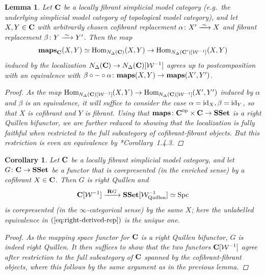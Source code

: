 \documentclass[reqno]{memo-l}
\theoremstyle{mythm}
\newtheorem{lemma}[thm]{Lemma}
\newtheorem{cor}[thm]{Corollary}
\theoremstyle{definition}
\numberwithin{equation}{section}
\newcommand{\Ww}{{\mathcal{W}}}
\DeclareMathOperator{\Spc}{Spc}
\renewcommand{\hom}{\textup{hom}}
\newcommand{\cat}[1]{\textbf{\textup{#1}}}
\newcommand{\maps}{\cat{maps}}
\newcommand{\op}{{\textup{op}}}
\renewcommand{\hom}{{\textup{Hom}}}
\newcommand{\id}{\textup{id}}
\newcommand{\iso}{\xrightarrow{\;\smash{\raisebox{-0.25ex}{\ensuremath{\scriptstyle\sim}}}\;}}
\begin{document}
\begin{lemma}\label{lemma:localization-on-homs}
    Let $\cat{C}$ be a locally fibrant simplicial model category (e.g.\ the underlying simplicial model category of topological model category), and let $X,Y\in\cat{C}$ with arbitrarily chosen cofibrant replacement $\alpha\colon X'\iso X$ and fibrant replacement $\beta\colon Y\iso Y'$. Then the map
    \[
        \maps_{\cat{C}}(X,Y)\simeq\hom_{N_\Delta(\cat{C})}(X,Y)\to\hom_{N_\Delta(\cat{C}')[\Ww^{-1}]}(X,Y)
    \]
    induced by the localization $N_\Delta(\cat{C})\to N_\Delta(\cat{C})[\Ww^{-1}]$ agrees up to postcomposition with an equivalence with $\beta\circ{-}\circ\alpha\colon\maps(X,Y)\to\maps(X',Y')$. 
    \begin{proof}
        As the map $\hom_{\kern-.5ptN_\Delta(\cat{C})[\Ww^{-1}]\kern-.5pt}(X,Y)\to\hom_{\kern-.5ptN_\Delta(\cat{C})[\Ww^{-1}]\kern-.5pt}(X',Y')$ induced by $\alpha$ and $\beta$ is an equivalence, it will suffice to consider the case $\alpha=\id_X,\beta=\id_Y$, so that $X$ is cofibrant and $Y$ is fibrant. Using that $\maps\colon\cat{C}^\op\times\cat{C}\to\cat{SSet}$ is a right Quillen bifunctor, we are further reduced to showing that the localization is fully faithful when restricted to the full subcategory of cofibrant-fibrant objects. But this restriction is even an equivalence by \cite{dk-modern}*{Corollary~1.4.3}.
    \end{proof}
\end{lemma}

\begin{cor}
    Let $\cat{C}$ be a locally fibrant simplicial model category, and let $G\colon\cat{C}\to\cat{SSet}$ be a functor that is corepresented (in the enriched sense) by a cofibrant $X\in\cat{C}$. Then $G$ is right Quillen and
    \begin{equation}\label{eq:right-derived-rep}
        \cat{C}[\Ww^{-1}]\xrightarrow{\;\cat{R}G\;}\cat{SSet}[\Ww_\textup{Quillen}^{-1}]\simeq\Spc
    \end{equation}
    is corepresented (in the $\infty$-categorical sense) by the same $X$; here the unlabelled equivalence in $(\textup{\ref{eq:right-derived-rep}})$ is the unique one.
    \begin{proof}
        As the mapping space functor for $\cat{C}$ is a right Quillen bifunctor, $G$ is indeed right Quillen. It then suffices to show that the two functors $\cat{C}[\Ww^{-1}]$ agree after restriction to the full subcategory of $\cat{C}$ spanned by the cofibrant-fibrant objects, where this follows by the same argument as in the previous lemma.
    \end{proof}
\end{cor}
\end{document}
